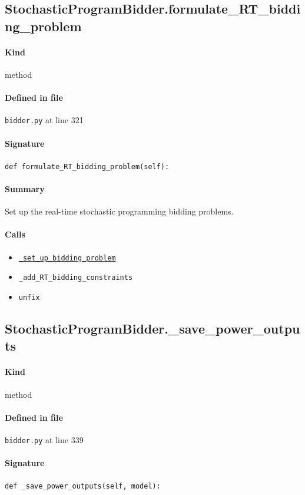 \documentclass[11pt]{report}
\begin{document}
\subsection{StochasticProgramBidder.formulate\_RT\_bidding\_problem}
\label{def:bidder.py:StochasticProgramBidder.formulate_RT_bidding_problem:L321}
\paragraph{Kind} method
\paragraph{Defined in file} \texttt{bidder.py} at line 321
\paragraph{Signature} \texttt{def formulate\_RT\_bidding\_problem(self):}
\paragraph{Summary} Set up the real-time stochastic programming bidding problems.
\paragraph{Calls}
\begin{itemize}[leftmargin=*]
  \item \hyperref[def:bidder.py:StochasticProgramBidder._set_up_bidding_problem:L275]{\texttt{\_set\_up\_bidding\_problem}}
  \item \texttt{\_add\_RT\_bidding\_constraints}
  \item \texttt{unfix}
\end{itemize}
\subsection{StochasticProgramBidder.\_save\_power\_outputs}
\label{def:bidder.py:StochasticProgramBidder._save_power_outputs:L339}
\paragraph{Kind} method
\paragraph{Defined in file} \texttt{bidder.py} at line 339
\paragraph{Signature} \texttt{def \_save\_power\_outputs(self, model):}
\end{document}
